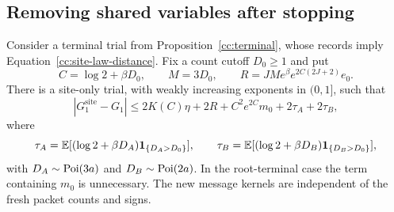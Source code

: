 \subsection{Removing shared variables after stopping}

\begin{lemma}\label{cc:kernel-collapse}
Consider a terminal trial from Proposition~\ref{cc:terminal}, whose
records imply Equation~\eqref{cc:site-law-distance}.  Fix a count cutoff
$D_0\ge1$ and put
\[
 C=\log2+\beta D_0,\qquad M=3D_0,
 \qquad
 R=JM e^\beta e^{2C(2J+2)}e_0.
\]
There is a site-only trial, with weakly increasing exponents in $(0,1]$,
such that
\begin{equation}\label{cc:collapse-error}
 |G_1^{\mathrm{site}}-G_1|
 \le 2K(C)\eta+2R+C^2e^{2C}m_0+2\tau_A+2\tau_B,
\end{equation}
where
\[
 \tau_A=\mathbb E[(\log2+\beta D_A)\mathbf 1_{\{D_A>D_0\}}],\qquad
 \tau_B=\mathbb E[(\log2+\beta D_B)\mathbf 1_{\{D_B>D_0\}}],
\]
with $D_A\sim\operatorname{Poi}(3a)$ and $D_B\sim\operatorname{Poi}(2a)$.
In the root-terminal case the term containing $m_0$ is unnecessary.
The new message kernels are independent of the fresh packet counts
and signs.
\end{lemma}

